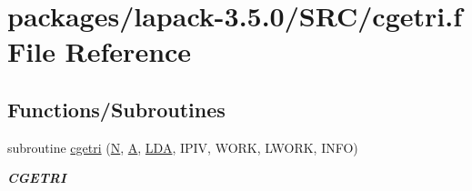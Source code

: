 \hypertarget{cgetri_8f}{}\section{packages/lapack-\/3.5.0/\+S\+R\+C/cgetri.f File Reference}
\label{cgetri_8f}
\subsection*{Functions/\+Subroutines}
\begin{DoxyCompactItemize}
\item 
subroutine \hyperlink{group__complexGEcomputational_gae22ce12a3734b080ad8369ebf7e9c3a7}{cgetri} (\hyperlink{polmisc_8c_a0240ac851181b84ac374872dc5434ee4}{N}, \hyperlink{classA}{A}, \hyperlink{example__user_8c_ae946da542ce0db94dced19b2ecefd1aa}{L\+D\+A}, I\+P\+I\+V, W\+O\+R\+K, L\+W\+O\+R\+K, I\+N\+F\+O)
\begin{DoxyCompactList}\small\item\em {\bfseries C\+G\+E\+T\+R\+I} \end{DoxyCompactList}\end{DoxyCompactItemize}
